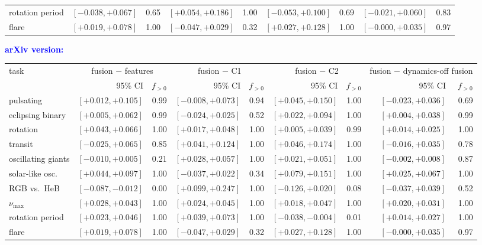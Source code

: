\documentclass{article}
\providecommand{\DIFaddbeginFL}{} %
\providecommand{\DIFaddendFL}{} %
\providecommand{\DIFdelendFL}{} %
\providecommand{\DIFaddincludegraphics}[2][]{{\color{blue}\fbox{\DIFOincludegraphics[#1]{#2}}}} %
\DeclareRobustCommand{\DIFaddbeginFL}{\DIFOaddbeginFL \let\includegraphics\DIFaddincludegraphics} %
\DeclareRobustCommand{\DIFaddendFL}{\DIFOaddendFL \let\includegraphics\DIFOincludegraphics} %
\DeclareRobustCommand{\DIFdelendFL}{\DIFOaddendFL \let\includegraphics\DIFOincludegraphics} %
\begin{document}
\begin{table}[H]
\begin{tabular}{lrrrrrrrr}
rotation period & $[-0.038, +0.067]$ & 0.65 & $\mathbf{[+0.054, +0.186]}$ & 1.00 & $[-0.053, +0.100]$ & 0.69 & $[-0.021, +0.060]$ & 0.83 \\
flare & $\mathbf{[+0.019, +0.078]}$ & 1.00 & $[-0.047, +0.029]$ & 0.32 & $\mathbf{[+0.027, +0.128]}$ & 1.00 & $[-0.000, +0.035]$ & 0.97 \\
\bottomrule
\end{tabular}
\endgroup\par\medskip
{\scriptsize\textcolor{blue}{\textbf{arXiv version:}}}\par\nobreak\smallskip
\DIFdelendFL \DIFaddbeginFL \begin{tabular}{lrrrrrrrr}
\toprule
task & \multicolumn{2}{c}{fusion $-$ features} & \multicolumn{2}{c}{fusion $-$ C1} & \multicolumn{2}{c}{fusion $-$ C2} & \multicolumn{2}{c}{fusion $-$ dynamics-off fusion} \\
 & 95\% CI & $f_{>0}$ & 95\% CI & $f_{>0}$ & 95\% CI & $f_{>0}$ & 95\% CI & $f_{>0}$ \\
\midrule
pulsating & $\mathbf{[+0.012, +0.105]}$ & 0.99 & $[-0.008, +0.073]$ & 0.94 & $\mathbf{[+0.045, +0.150]}$ & 1.00 & $[-0.023, +0.036]$ & 0.69 \\
eclipsing binary & $\mathbf{[+0.005, +0.062]}$ & 0.99 & $[-0.024, +0.025]$ & 0.52 & $\mathbf{[+0.022, +0.094]}$ & 1.00 & $\mathbf{[+0.004, +0.038]}$ & 0.99 \\
rotation & $\mathbf{[+0.043, +0.066]}$ & 1.00 & $\mathbf{[+0.017, +0.048]}$ & 1.00 & $\mathbf{[+0.005, +0.039]}$ & 0.99 & $\mathbf{[+0.014, +0.025]}$ & 1.00 \\
transit & $[-0.025, +0.065]$ & 0.85 & $\mathbf{[+0.041, +0.124]}$ & 1.00 & $\mathbf{[+0.046, +0.174]}$ & 1.00 & $[-0.016, +0.035]$ & 0.78 \\
oscillating giants & $[-0.010, +0.005]$ & 0.21 & $\mathbf{[+0.028, +0.057]}$ & 1.00 & $\mathbf{[+0.021, +0.051]}$ & 1.00 & $[-0.002, +0.008]$ & 0.87 \\
solar-like osc. & $\mathbf{[+0.044, +0.097]}$ & 1.00 & $[-0.037, +0.022]$ & 0.34 & $\mathbf{[+0.079, +0.151]}$ & 1.00 & $\mathbf{[+0.025, +0.067]}$ & 1.00 \\
RGB vs.\ HeB & $\mathbf{[-0.087, -0.012]}$ & 0.00 & $\mathbf{[+0.099, +0.247]}$ & 1.00 & $[-0.126, +0.020]$ & 0.08 & $[-0.037, +0.039]$ & 0.52 \\
$\nu_{\max}$ & $\mathbf{[+0.028, +0.043]}$ & 1.00 & $\mathbf{[+0.024, +0.045]}$ & 1.00 & $\mathbf{[+0.018, +0.047]}$ & 1.00 & $\mathbf{[+0.020, +0.031]}$ & 1.00 \\
rotation period & $\mathbf{[+0.023, +0.046]}$ & 1.00 & $\mathbf{[+0.039, +0.073]}$ & 1.00 & $\mathbf{[-0.038, -0.004]}$ & 0.01 & $\mathbf{[+0.014, +0.027]}$ & 1.00 \\
flare & $\mathbf{[+0.019, +0.078]}$ & 1.00 & $[-0.047, +0.029]$ & 0.32 & $\mathbf{[+0.027, +0.128]}$ & 1.00 & $[-0.000, +0.035]$ & 0.97 \\
\bottomrule
\end{tabular}
\DIFaddendFL 

\end{table}
\end{document}
